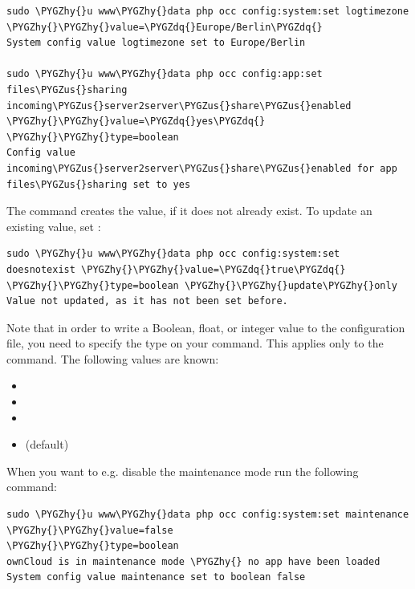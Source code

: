 \documentclass[letterpaper,10pt,english]{sphinxmanual}
\def\PYGZus{\char`\_}
\def\PYGZhy{\char`\-}
\def\PYGZdq{\char`\"}
\begin{document}
\begin{Verbatim}[commandchars=\\\{\}]
sudo \PYGZhy{}u www\PYGZhy{}data php occ config:system:set logtimezone
\PYGZhy{}\PYGZhy{}value=\PYGZdq{}Europe/Berlin\PYGZdq{}
System config value logtimezone set to Europe/Berlin

sudo \PYGZhy{}u www\PYGZhy{}data php occ config:app:set files\PYGZus{}sharing
incoming\PYGZus{}server2server\PYGZus{}share\PYGZus{}enabled \PYGZhy{}\PYGZhy{}value=\PYGZdq{}yes\PYGZdq{} \PYGZhy{}\PYGZhy{}type=boolean
Config value incoming\PYGZus{}server2server\PYGZus{}share\PYGZus{}enabled for app files\PYGZus{}sharing set to yes
\end{Verbatim}

The  command creates the value, if it does not already
exist. To update an existing value,  set :

\begin{Verbatim}[commandchars=\\\{\}]
sudo \PYGZhy{}u www\PYGZhy{}data php occ config:system:set doesnotexist \PYGZhy{}\PYGZhy{}value=\PYGZdq{}true\PYGZdq{}
\PYGZhy{}\PYGZhy{}type=boolean \PYGZhy{}\PYGZhy{}update\PYGZhy{}only
Value not updated, as it has not been set before.
\end{Verbatim}

Note that in order to write a Boolean, float, or integer value to the
configuration file, you need to specify the type on your command. This
applies only to the  command. The following values are
known:
\begin{itemize}
\item {} 

\item {} 

\item {} 

\item {} 
 (default)

\end{itemize}

When you want to e.g. disable the maintenance mode run the following command:

\begin{Verbatim}[commandchars=\\\{\}]
sudo \PYGZhy{}u www\PYGZhy{}data php occ config:system:set maintenance \PYGZhy{}\PYGZhy{}value=false
\PYGZhy{}\PYGZhy{}type=boolean
ownCloud is in maintenance mode \PYGZhy{} no app have been loaded
System config value maintenance set to boolean false
\end{Verbatim}
\end{document}
